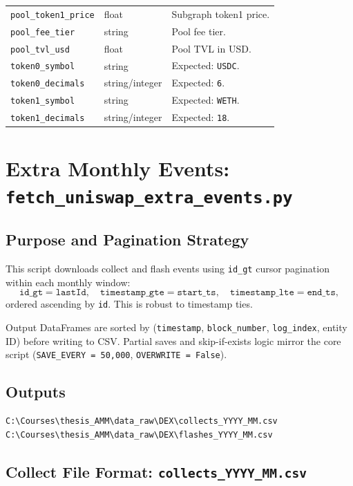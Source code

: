 \documentclass[11pt,a4paper]{article}
\begin{document}
\begin{xltabular}{\linewidth}{L{4.5cm}L{3.0cm}Y}
\texttt{pool\_token1\_price} & float & Subgraph token1 price. \\
\texttt{pool\_fee\_tier} & string & Pool fee tier. \\
\texttt{pool\_tvl\_usd} & float & Pool TVL in USD. \\
\texttt{token0\_symbol} & string & Expected: \texttt{USDC}. \\
\texttt{token0\_decimals} & string/integer & Expected: \texttt{6}. \\
\texttt{token1\_symbol} & string & Expected: \texttt{WETH}. \\
\texttt{token1\_decimals} & string/integer & Expected: \texttt{18}. \\
\bottomrule
\end{xltabular}

\section{Extra Monthly Events: \texttt{fetch\_uniswap\_extra\_events.py}}
\label{sec:extra}

\subsection{Purpose and Pagination Strategy}

This script downloads collect and flash events using \texttt{id\_gt} cursor
pagination within each monthly window:
\[
  \texttt{id\_gt} = \texttt{lastId}, \quad
  \texttt{timestamp\_gte} = \texttt{start\_ts}, \quad
  \texttt{timestamp\_lte} = \texttt{end\_ts},
\]
ordered ascending by \texttt{id}. This is robust to timestamp ties.

Output DataFrames are sorted by
(\texttt{timestamp}, \texttt{block\_number}, \texttt{log\_index},
entity ID) before writing to CSV. Partial saves and skip-if-exists logic
mirror the core script (\texttt{SAVE\_EVERY = 50{,}000},
\texttt{OVERWRITE = False}).

\subsection{Outputs}

\begin{lstlisting}
C:\Courses\thesis_AMM\data_raw\DEX\collects_YYYY_MM.csv
C:\Courses\thesis_AMM\data_raw\DEX\flashes_YYYY_MM.csv
\end{lstlisting}

\subsection{Collect File Format: \texttt{collects\_YYYY\_MM.csv}}
\end{document}
